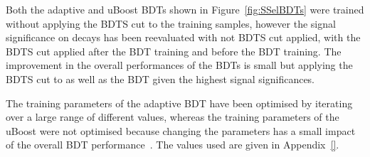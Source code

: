 Both the adaptive and uBoost BDTs shown in Figure~\ref{fig:SSelBDTs} were trained without applying the BDTS cut to the training samples, however the signal significance on \bhh decays has been reevaluated with not BDTS cut applied, with the BDTS cut applied after the BDT training and before the BDT training. The improvement in the overall performances of the BDTs is small but applying the BDTS cut to \bhh as well as the BDT given the highest signal significances. 

The training parameters of the adaptive BDT have been optimised by iterating over a large range of different values, whereas the training parameters of the uBoost were not optimised because changing the parameters has a small impact of the overall BDT performance~\cite{}. The values used are given in Appendix~\ref{}. 

